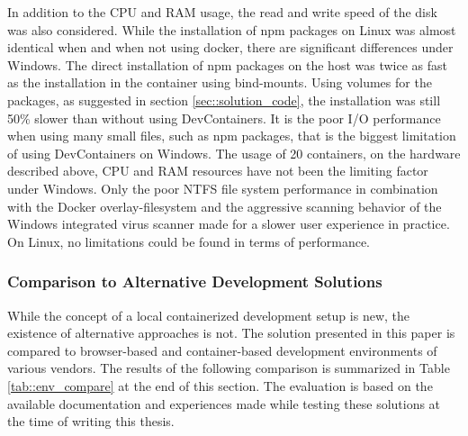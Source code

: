         In addition to the CPU and RAM usage, the read and write speed of the disk was also considered. While the installation of npm packages on Linux was almost identical when and when not using docker, there are significant differences under Windows. The direct installation of npm packages on the host was twice as fast as the installation in the container using bind-mounts. Using volumes for the packages, as suggested in section \ref{sec::solution_code}, the installation was still 50\% slower than without using DevContainers. It is the poor I/O performance when using many small files, such as npm packages, that is the biggest limitation of using DevContainers on Windows. The usage of 20 containers, on the hardware described above, CPU and RAM resources have not been the limiting factor under Windows. Only the poor NTFS file system performance in combination with the Docker overlay-filesystem and the aggressive scanning behavior of the Windows integrated virus scanner made for a slower user experience in practice. On Linux, no limitations could be found in terms of performance.
        

    \subsubsection{Comparison to Alternative Development Solutions}
    While the concept of a local containerized development setup is new, the existence of alternative approaches is not. The solution presented in this paper is compared to browser-based and container-based development environments of various vendors. The results of the following comparison is summarized in Table \ref{tab::env_compare} at the end of this section. The evaluation is based on the available documentation and experiences made while testing these solutions at the time of writing this thesis.

